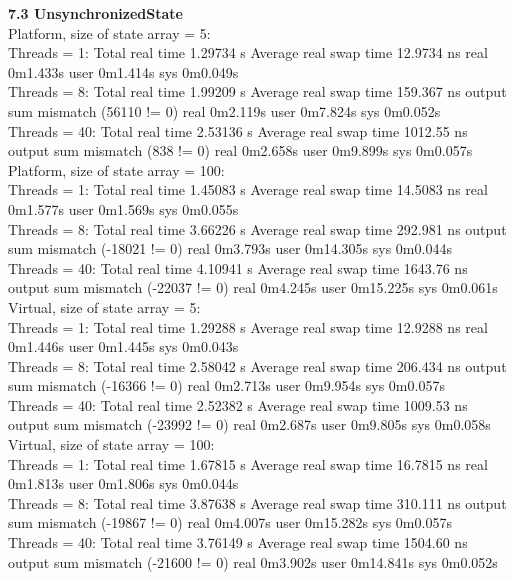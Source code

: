 \documentclass[letterpaper,twocolumn,10pt]{article}
\begin{document}
\textbf{7.3 UnsynchronizedState}\\

\noindent Platform, size of state array = 5:\\
Threads = 1: Total real time 1.29734 s
Average real swap time 12.9734 ns
real    0m1.433s
user    0m1.414s
sys     0m0.049s\\
Threads = 8: Total real time 1.99209 s
Average real swap time 159.367 ns
output sum mismatch (56110 != 0)
real    0m2.119s
user    0m7.824s
sys     0m0.052s\\
Threads = 40: Total real time 2.53136 s
Average real swap time 1012.55 ns
output sum mismatch (838 != 0)
real    0m2.658s
user    0m9.899s
sys     0m0.057s\\

\noindent Platform, size of state array = 100:\\
Threads = 1: Total real time 1.45083 s
Average real swap time 14.5083 ns
real    0m1.577s
user    0m1.569s
sys     0m0.055s\\
Threads = 8: Total real time 3.66226 s
Average real swap time 292.981 ns
output sum mismatch (-18021 != 0)
real    0m3.793s
user    0m14.305s
sys     0m0.044s\\
Threads = 40: Total real time 4.10941 s
Average real swap time 1643.76 ns
output sum mismatch (-22037 != 0)
real    0m4.245s
user    0m15.225s
sys     0m0.061s\\

\noindent Virtual, size of state array = 5:\\
Threads = 1: Total real time 1.29288 s
Average real swap time 12.9288 ns
real    0m1.446s
user    0m1.445s
sys     0m0.043s\\
Threads = 8: Total real time 2.58042 s
Average real swap time 206.434 ns
output sum mismatch (-16366 != 0)
real    0m2.713s
user    0m9.954s
sys     0m0.057s\\
Threads = 40: Total real time 2.52382 s
Average real swap time 1009.53 ns
output sum mismatch (-23992 != 0)
real    0m2.687s
user    0m9.805s
sys     0m0.058s\\

\noindent Virtual, size of state array = 100:\\
Threads = 1: Total real time 1.67815 s
Average real swap time 16.7815 ns
real    0m1.813s
user    0m1.806s
sys     0m0.044s\\
Threads = 8: Total real time 3.87638 s
Average real swap time 310.111 ns
output sum mismatch (-19867 != 0)
real    0m4.007s
user    0m15.282s
sys     0m0.057s\\
Threads = 40: Total real time 3.76149 s
Average real swap time 1504.60 ns
output sum mismatch (-21600 != 0)
real    0m3.902s
user    0m14.841s
sys     0m0.052s\\

\end{document}
